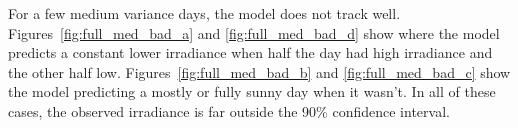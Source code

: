 For a few medium variance days, the model does not track well. Figures~\ref{fig:full_med_bad_a} and \ref{fig:full_med_bad_d} show where the model predicts a constant lower irradiance when half the day had high irradiance and the other half low. Figures~\ref{fig:full_med_bad_b} and \ref{fig:full_med_bad_c} show the model predicting a mostly or fully sunny day when it wasn't. In all of these cases, the observed irradiance is far outside the 90\% confidence interval.
\begin{figure}[ht!]
    \centering
    \qquad
    \qquad
    \qquad

\end{figure}
